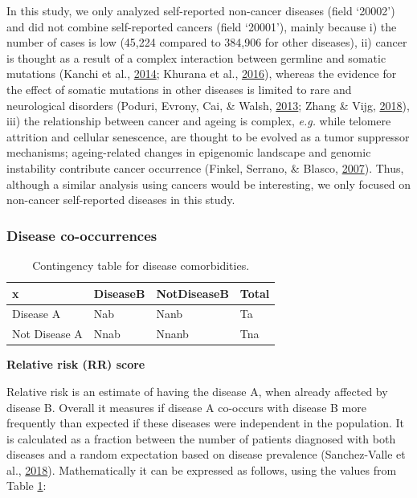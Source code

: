 \documentclass[12pt,twoside]{unicam}
\begin{document}
In this study, we only analyzed self-reported non-cancer diseases (field `20002') and did not combine self-reported cancers (field `20001'), mainly because i) the number of cases is low (45,224 compared to 384,906 for other diseases), ii) cancer is thought as a result of a complex interaction between germline and somatic mutations (Kanchi et al., \protect\hyperlink{ref-Kanchi2014}{2014}; Khurana et al., \protect\hyperlink{ref-Khurana2016}{2016}), whereas the evidence for the effect of somatic mutations in other diseases is limited to rare and neurological disorders (Poduri, Evrony, Cai, \& Walsh, \protect\hyperlink{ref-Poduri2013}{2013}; Zhang \& Vijg, \protect\hyperlink{ref-Zhang2018}{2018}), iii) the relationship between cancer and ageing is complex, \emph{e.g.} while telomere attrition and cellular senescence, are thought to be evolved as a tumor suppressor mechanisms; ageing-related changes in epigenomic landscape and genomic instability contribute cancer occurrence (Finkel, Serrano, \& Blasco, \protect\hyperlink{ref-Finkel2007}{2007}). Thus, although a similar analysis using cancers would be interesting, we only focused on non-cancer self-reported diseases in this study.

\hypertarget{disease-co-occurrences-1}{%
\subsubsection{Disease co-occurrences}\label{disease-co-occurrences-1}}

\begingroup\fontsize{12}{14}\selectfont

\begin{longtable}[t]{llll}
\caption{\label{tab:discooccurTable}Contingency table for disease comorbidities.}\\
\toprule
x & DiseaseB & NotDiseaseB & Total\\
\midrule
Disease A & Nab & Nanb & Ta\\
Not Disease A & Nnab & Nnanb & Tna\\
\bottomrule
\end{longtable}
\endgroup{}

\textbf{Relative risk (RR) score}

Relative risk is an estimate of having the disease A, when already affected by disease B. Overall it measures if disease A co-occurs with disease B more frequently than expected if these diseases were independent in the population. It is calculated as a fraction between the number of patients diagnosed with both diseases and a random expectation based on disease prevalence (Sanchez-Valle et al., \protect\hyperlink{ref-Sanchez-Valle2018}{2018}). Mathematically it can be expressed as follows, using the values from Table \ref{tab:discooccurTable}:
\end{document}
